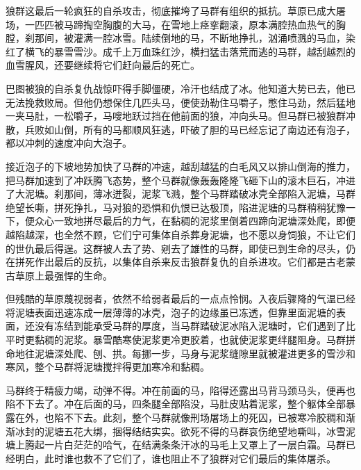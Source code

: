 \par 狼群这最后一轮疯狂的自杀攻击，彻底摧垮了马群有组织的抵抗。草原已成大屠场，一匹匹被马蹄掏空胸腹的大马，在雪地上痉挛翻滚，原本满腔热血热气的胸膛，刹那间，被灌满一腔冰雪。陆续倒地的马，不断地挣扎，汹涌喷溅的马血，染红了横飞的暴雪雪沙。成千上万血珠红沙，横扫猛击落荒而逃的马群，越刮越烈的血雪腥风，还要继续将它们赶向最后的死亡。
\par 巴图被狼的自杀复仇战惊吓得手脚僵硬，冷汗也结成了冰。他知道大势已去，他已无法挽救败局。但他仍想保住几匹头马，便使劲勒住马嚼子，憋住马劲，然后猛地一夹马肚，一松嚼子，马嗖地跃过挡在他前面的狼，冲向头马。但马群已被狼群冲散，兵败如山倒，所有的马都顺风狂逃，吓破了胆的马已经忘记了南边还有泡子，都以冲刺的速度冲向大泡子。
\par 接近泡子的下坡地势加快了马群的冲速，越刮越猛的白毛风又以排山倒海的推力，把马群加速到了冲跃腾飞态势，整个马群就像轰轰隆隆飞砸下山的滚木巨石，冲进了大泥塘。刹那间，薄冰迸裂，泥浆飞溅，整个马群踏破冰壳全部陷入泥塘，马群绝望长嘶，拼死挣扎，马对狼的恐惧和仇恨已达极顶，陷进泥塘的马群稍稍犹豫一下，便众心一致地拼尽最后的力气，在黏稠的泥浆里倒着四蹄向泥塘深处爬，即便越陷越深，也全然不顾，它们宁可集体自杀葬身泥塘，也不愿以身饲狼，不让它们的世仇最后得逞。这群被人去了势、剜去了雄性的马群，即使已到生命的尽头，仍在拼死作出最后的反抗，以集体自杀来反击狼群复仇的自杀进攻。它们都是古老蒙古草原上最强悍的生命。
\par 但残酷的草原蔑视弱者，依然不给弱者最后的一点点怜悯。入夜后骤降的气温已经将泥塘表面迅速冻成一层薄薄的冰壳，泡子的边缘虽已冻透，但靠里面泥塘的表面，还没有冻结到能承受马群的厚度，当马群踏破泥冰陷入泥塘时，它们遇到了比平时更黏稠的泥浆。暴雪酷寒使泥浆更冷更胶着，也就使泥浆更绊腿阻身。马群拼命地往泥塘深处爬、刨、拱。每挪一步，马身与泥浆缝隙里就被灌进更多的雪沙和寒风，整个马群将泥塘搅拌得更加寒冷和黏稠。
\par 马群终于精疲力竭，动弹不得。冲在前面的马，陷得还露出马背马颈马头，便再也陷不下去了。冲在后面的马，四条腿全部陷没，马肚皮贴着泥浆，整个躯体全部暴露在外，也陷不下去。此刻，整个马群就像刑场屠场上的死囚，已被寒冷胶稠和渐渐冰封的泥塘五花大绑，捆得结结实实。欲死不得的马群哀伤绝望地嘶叫，冰雪泥塘上腾起一片白茫茫的哈气，在结满条条汗冰的马毛上又罩上了一层白霜。马群已经明白，此时谁也救不了它们了，谁也阻止不了狼群对它们最后的集体屠杀。
